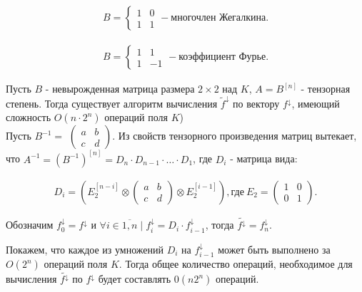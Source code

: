 \begin{align*}
    B = 
    \begin{cases}
        1 & 0\\
        1 & 1
    \end{cases}
    - \text{многочлен Жегалкина}.
\end{align*}

\begin{align*}
    B = 
    \begin{cases}
        1 & 1\\
        1 & -1
    \end{cases}
    - \text{коэффициент Фурье}.
\end{align*}

\thr Пусть $B$ - невырожденная матрица размера $2 \times 2$  над $K$, $A = B^{[n]}$ - тензорная степень. Тогда существует алгоритм вычисления $\widetilde{f}^\downarrow$ по вектору $f^\downarrow$, имеющий сложность $O(n \cdot 2^n)$ операций поля $K$)\\

\proof Пусть $B^{-1} = $ $\begin{pmatrix}
        a & b\\
        c & d
    \end{pmatrix}$.
Из свойств тензорного произведения матриц вытекает, что $A^{-1} = (B^{-1})^{[n]}= D_n \cdot D_{n-1} \cdot \ldots \cdot D_1$, где $D_i$ - матрица вида:

\begin{align*}
    D_i = \left( E_2^{[n-i]} \otimes
    \begin{pmatrix}
        a & b\\
        c & d
    \end{pmatrix}
    \otimes E_2^{[i-1]} \right), \text{где}\  E_2 = 
    \begin{pmatrix}
        1 & 0 \\
        0 & 1
    \end{pmatrix}.
\end{align*}

Обозначим $f_0^\downarrow = f^\downarrow$ и $\forall i \in \overline{1,n} \mid f_i^\downarrow = D_i \cdot f_{i-1}^\downarrow$, тогда $\widetilde{f^\downarrow} = f_n^\downarrow$.

Покажем, что каждое из умножений $D_i$ на $f_{i-1}^\downarrow$ может быть выполнено за $O(2^n)$ операций поля $K$. Тогда общее количество операций, 
необходимое для вычисления $\widetilde{f^\downarrow}$ по $f^\downarrow$ будет составлять $0(n2^n)$ операций.

